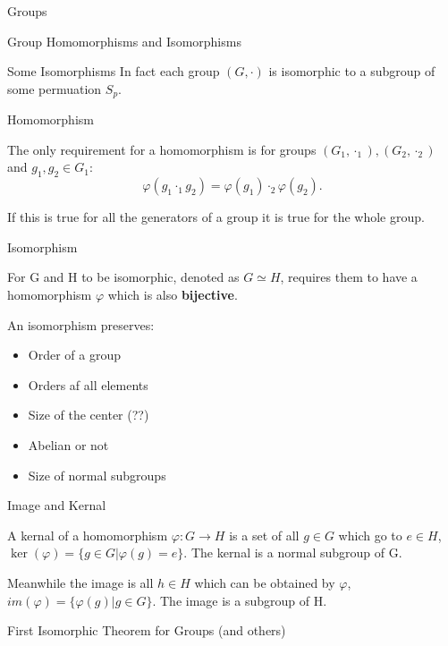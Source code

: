 \documentclass[12pt, letterpaper]{article}
\begin{document}
\begin{section}{Groups}
\begin{subsection}{Group Homomorphisms and Isomorphisms}
\begin{subsubsection}{Some Isomorphisms}
      In fact each group \((G, \cdot)\) is isomorphic to a subgroup of some
      permuation \(S_{p}\).

    \end{subsubsection}

    \begin{subsubsection}{Homomorphism}

      The only requirement for a homomorphism is for groups \((G_{1}, \cdot_{1}),
      (G_{2}, \cdot_{2})\) and \(g_{1}, g_{2} \in G_{1}\):
      \[\varphi(g_{1} \cdot_{1} g_{2}) = \varphi(g_{1}) \cdot_{2} \varphi(g_{2}).\]

      If this is true for all the generators of a group it is true for the whole
      group.

    \end{subsubsection}

    \begin{subsubsection}{Isomorphism}

      For G and H to be isomorphic, denoted as \(G \simeq H\), requires them
      to have a  homomorphism \(\varphi\) which is also \textbf{bijective}.

      An isomorphism preserves:
      \begin{itemize}
        \item Order of a group
        \item Orders af all elements
        \item Size of the center (??)
        \item Abelian or not
        \item Size of normal subgroups
      \end{itemize}

    \end{subsubsection}

    \begin{subsubsection}{Image and Kernal}

      A kernal of a homomorphism \(\varphi : G \to H\) is a set of all \(g \in G\)
      which go to \(e \in H\), \(\ker(\varphi) = \{ g \in G | \varphi(g) = e \}\).
      The kernal is a normal subgroup of G.

      Meanwhile the image is all \(h \in H\) which can be obtained by \(\varphi\),
      \(im(\varphi) = \{ \varphi(g) | g \in G \}\).
      The image is a subgroup of H.

    \end{subsubsection}

    \begin{subsubsection}{First Isomorphic Theorem for Groups (and others)}


\end{subsubsection}
\end{subsection}
\end{section}
\end{document}
